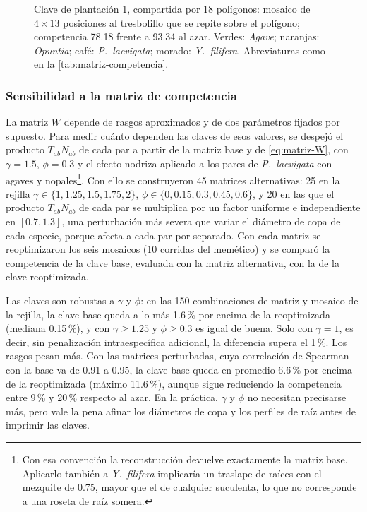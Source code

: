 \begin{figure}
\centering

\caption{Clave de plantación 1, compartida por 18 polígonos: mosaico de $4\times13$ posiciones al tresbolillo que se repite sobre el polígono; competencia 78.18 frente a 93.34 al azar. Verdes: \textit{Agave}; naranjas: \textit{Opuntia}; café: \textit{P.~laevigata}; morado: \textit{Y.~filifera}. Abreviaturas como en la \cref{tab:matriz-competencia}.}
\label{fig:clave1}
\end{figure}

\subsubsection{Sensibilidad a la matriz de competencia}
\label{subsec:res-sensibilidad}

La matriz $W$ depende de rasgos aproximados y de dos parámetros fijados por supuesto. Para medir cuánto dependen las claves de esos valores, se despejó el producto $T_{ab}N_{ab}$ de cada par a partir de la matriz base y de \eqref{eq:matriz-W}, con $\gamma=1.5$, $\phi=0.3$ y el efecto nodriza aplicado a los pares de \textit{P.~laevigata} con agaves y nopales\footnote{Con esa convención la reconstrucción devuelve exactamente la matriz base. Aplicarlo también a \textit{Y.~filifera} implicaría un traslape de raíces con el mezquite de 0.75, mayor que el de cualquier suculenta, lo que no corresponde a una roseta de raíz somera.}. Con ello se construyeron 45 matrices alternativas: 25 en la rejilla $\gamma\in\{1,1.25,1.5,1.75,2\}$, $\phi\in\{0,0.15,0.3,0.45,0.6\}$, y 20 en las que el producto $T_{ab}N_{ab}$ de cada par se multiplica por un factor uniforme e independiente en $[0.7,1.3]$, una perturbación más severa que variar el diámetro de copa de cada especie, porque afecta a cada par por separado. Con cada matriz se reoptimizaron los seis mosaicos (10 corridas del memético) y se comparó la competencia de la clave base, evaluada con la matriz alternativa, con la de la clave reoptimizada.

Las claves son robustas a $\gamma$ y $\phi$: en las 150 combinaciones de matriz y mosaico de la rejilla, la clave base queda a lo más 1.6\,\% por encima de la reoptimizada (mediana 0.15\,\%), y con $\gamma\geq1.25$ y $\phi\geq0.3$ es igual de buena. Solo con $\gamma=1$, es decir, sin penalización intraespecífica adicional, la diferencia supera el 1\,\%. Los rasgos pesan más. Con las matrices perturbadas, cuya correlación de Spearman con la base va de 0.91 a 0.95, la clave base queda en promedio 6.6\,\% por encima de la reoptimizada (máximo 11.6\,\%), aunque sigue reduciendo la competencia entre 9\,\% y 20\,\% respecto al azar. En la práctica, $\gamma$ y $\phi$ no necesitan precisarse más, pero vale la pena afinar los diámetros de copa y los perfiles de raíz antes de imprimir las claves.

